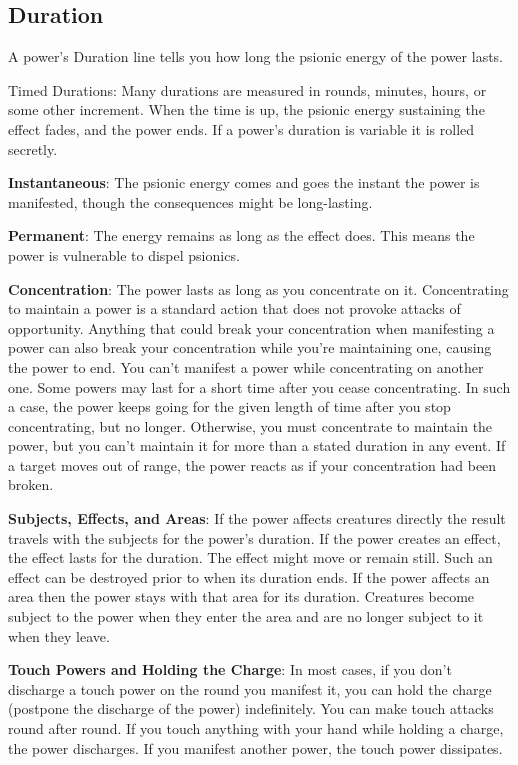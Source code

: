 \subsection{Duration}
A power's Duration line tells you how long the psionic energy of the power lasts.

Timed Durations: Many durations are measured in rounds, minutes, hours, or some other increment. When the time is up, the psionic energy sustaining the effect fades, and the power ends. If a power's duration is variable it is rolled secretly.

\textbf{Instantaneous}: The psionic energy comes and goes the instant the power is manifested, though the consequences might be long-lasting.

\textbf{Permanent}: The energy remains as long as the effect does. This means the power is vulnerable to dispel psionics.

\textbf{Concentration}: The power lasts as long as you concentrate on it. Concentrating to maintain a power is a standard action that does not provoke attacks of opportunity. Anything that could break your concentration when manifesting a power can also break your concentration while you're maintaining one, causing the power to end. You can't manifest a power while concentrating on another one. Some powers may last for a short time after you cease concentrating. In such a case, the power keeps going for the given length of time after you stop concentrating, but no longer. Otherwise, you must concentrate to maintain the power, but you can't maintain it for more than a stated duration in any event. If a target moves out of range, the power reacts as if your concentration had been broken.

\textbf{Subjects, Effects, and Areas}: If the power affects creatures directly the result travels with the subjects for the power's duration. If the power creates an effect, the effect lasts for the duration. The effect might move or remain still. Such an effect can be destroyed prior to when its duration ends. If the power affects an area then the power stays with that area for its duration. Creatures become subject to the power when they enter the area and are no longer subject to it when they leave.

\textbf{Touch Powers and Holding the Charge}: In most cases, if you don't discharge a touch power on the round you manifest it, you can hold the charge (postpone the discharge of the power) indefinitely. You can make touch attacks round after round. If you touch anything with your hand while holding a charge, the power discharges. If you manifest another power, the touch power dissipates.

